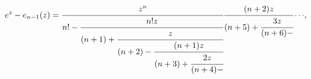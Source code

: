 \[e^{z}-e_{n-1}(z)={\cfrac{z^{n}}{n!-\cfrac{n!z}{(n+1)+\cfrac{z}{(n+2)-\cfrac{(n%
+1)z}{(n+3)+\cfrac{2z}{(n+4)-}}}}}\cfrac{(n+2)z}{(n+5)+\cfrac{3z}{(n+6)-}}%
\cdots},\]